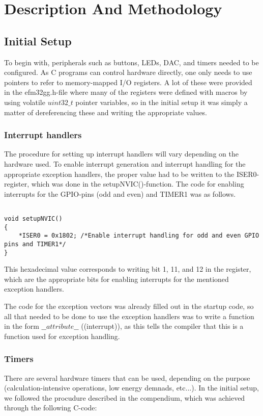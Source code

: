 \section{Description And Methodology}

\subsection{Initial Setup}
To begin with, peripherals such as buttons, LEDs, DAC, and timers needed to be configured. As C programs can control hardware directly, one only needs to use pointers to refer to memory-mapped I/O registers. A lot of these were provided in the efm32gg.h-file where many of the registers were defined with macros by using volatile $uint32\_t$ pointer variables, so in the initial setup it was simply a matter of dereferencing these and writing the appropriate values.


\subsubsection{Interrupt handlers}
The procedure for setting up interrupt handlers will vary depending on the hardware used. To enable interrupt generation and interrupt handling for the appropriate exception handlers, the proper value had to be written to the ISER0-register, which was done in the setupNVIC()-function. The code for enabling interrupts for the GPIO-pins (odd and even) and TIMER1 was as follows.

\begin{lstlisting}

void setupNVIC()
{
 	*ISER0 = 0x1802; /*Enable interrupt handling for odd and even GPIO pins and TIMER1*/
}

\end{lstlisting} 
This hexadecimal value corresponds to writing bit 1, 11, and 12 in the register, which are the appropriate bits for enabling interrupts for the mentioned exception handlers.

The code for the exception vectors was already filled out in the startup code, so all that needed to be done to use the exception handlers was to write a function in the form $\_\_attribute\_\_$ ((interrupt)), as this tells the compiler that this is a function used for exception handling.


\subsubsection{Timers}
There are several hardware timers that can be used, depending on the purpose (calculation-intensive operations, low energy demnads, etc...). In the initial setup, we followed the procudure described in the compendium, which was achieved through the following C-code:

